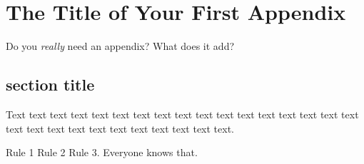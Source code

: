 \chapter{The Title of Your First Appendix}

Do you \textit{really} need an appendix? What does it add?

\section{section title}
Text text text text text text text text text text text text text text
text text text text text text text text text text text text text text. 

Rule 1 Rule 2 Rule 3. Everyone knows that.

